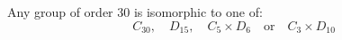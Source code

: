 \begin{mdframed}[align=center,nobreak=true]
    \begin{center}
        Any group of order 30 is isomorphic to one of:
        \[
            C_{30}, \quad%
            D_{15}, \quad%
            C_5 \times D_6 \quad \text{or} \quad%
            C_3 \times D_{10}
        \]
    \end{center}
\end{mdframed}
